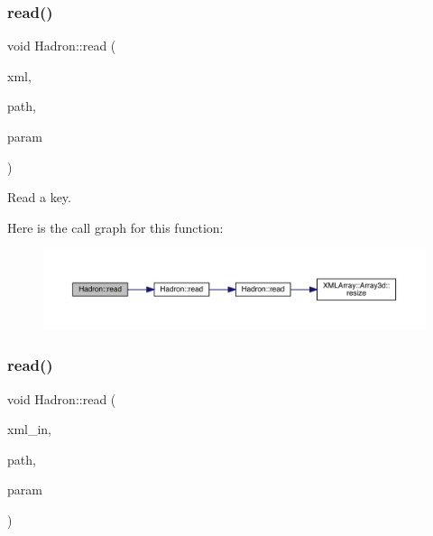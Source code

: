 \subsubsection{\texorpdfstring{read()}{read()}\hspace{0.1cm}{\footnotesize\ttfamily [6/94]}}
{\footnotesize\ttfamily void Hadron\+::read (\begin{DoxyParamCaption}\item[{\mbox{\hyperlink{classADATXML_1_1XMLReader}{X\+M\+L\+Reader}} \&}]{xml,  }\item[{const std\+::string \&}]{path,  }\item[{\mbox{\hyperlink{structHadron_1_1KeyCGCIrrepMom__t}{Key\+C\+G\+C\+Irrep\+Mom\+\_\+t}} \&}]{param }\end{DoxyParamCaption})}



Read a key. 

Here is the call graph for this function\+:\nopagebreak
\begin{figure}[H]
\begin{center}
\leavevmode
\includegraphics[width=350pt]{d1/daf/namespaceHadron_ab8d127a4d4a1ca38aae1b0d45226789e_cgraph}
\end{center}
\end{figure}
\mbox{\label{namespaceHadron_a9fc0b61edf5216d1720dabf68810d3b5}} 
\subsubsection{\texorpdfstring{read()}{read()}\hspace{0.1cm}{\footnotesize\ttfamily [7/94]}}
{\footnotesize\ttfamily void Hadron\+::read (\begin{DoxyParamCaption}\item[{\mbox{\hyperlink{classADATXML_1_1XMLReader}{X\+M\+L\+Reader}} \&}]{xml\+\_\+in,  }\item[{const std\+::string \&}]{path,  }\item[{\mbox{\hyperlink{structHadron_1_1QuarkNum__t}{Quark\+Num\+\_\+t}} \&}]{param }\end{DoxyParamCaption})}



